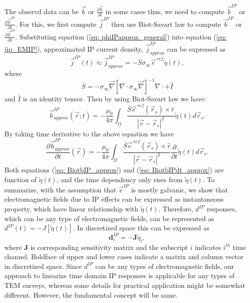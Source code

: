 \documentclass[a4paper, 11pt]{article}
\renewcommand{\div}{\nabla\cdot}
\newcommand{\grad}{\vec \nabla}
\newcommand{\siginf}{\sigma_\infty}
\renewcommand {\j}  { {\vec j} }
\renewcommand {\b}  { {\vec b} }
\newcommand {\e}  { {\vec e} }
\newcommand{\peta}{\tilde{\eta}}
\newcommand{\dip}{d^{IP}}
\begin{document}
The observd data can be $\b$ or $\frac{\partial \b}{\partial t}$ in some cases thus, we need to compute $\b^{IP}$ or $\frac{\partial \b^{IP}}{\partial t}$. For this, we first compute $\j^{IP}$ then use Biot-Savart law to compute $\b^{IP}$ or $\frac{\partial \b^{IP}}{\partial t}$. Substituting equation (\ref{eq: phiIPapprox_general}) into equation (\ref{eq: jip_EMIP}), approximated IP current density, $\j^{IP}_{approx}$ can be expressed as
\begin{equation}
  \j^{IP}(t) \approx \j^{IP}_{approx} = -\bar{S}\siginf\e^{\ ref}\peta(t),
  \label{eq: jip_approx}
\end{equation}
where
\begin{equation}
  \bar{S} = -\siginf\grad[\div \siginf\grad]^{-1}\div+\bar{I}
\end{equation}
and $\bar{I}$ is an identity tensor. Then by using Biot-Savart law we have:
\begin{equation}
  \b^{IP}_{approx}(\vec{r}; t) = -\frac{\mu_0}{4\pi}\int_{\Omega}  \frac{\bar{S}\e^{\ ref}(\vec{r}_s)\times\hat{r}}{|\vec{r}-\vec{r}_s|^2}\peta(t)d\vec{r}_s.
  \label{eq: BiotbIP_approx}
\end{equation}
By taking time derivative to the above equation we have
\begin{equation}
  \frac{\partial\b^{IP}_{approx}}{\partial t}(\vec{r}) = -\frac{\mu_0}{4\pi} \int_{\Omega}  \frac{\bar{S}\e^{\ ref}(\vec{r}_s)\times\hat{r}}{|\vec{r}-\vec{r}_s|^2}\frac{\partial}{\partial t}\peta(t)d\vec{r}_s.
  \label{eq: BiotbIPdt_approx}
\end{equation}
Both equations (\ref{eq: BiotbIP_approx}) and (\ref{eq: BiotbIPdt_approx}) are function of $\peta(t)$, and the time dependency only rises from $\peta(t)$. 
To summarize, with the assumption that $\e^{IP}$ is mostly galvanic, we show that electromagnetic fields due to IP effects can be expressed as instantaneous property, which have linear relationship with $\peta(t)$. Therefore, $\dip$ responses, which can be any type of electromagnetic fields, can be represented as $\dip(t) = -J[\peta(t)]$. In discretized space this can be expressed as
\begin{equation}
  \mathbf{d}^{IP}_i = -\mathbf{J}\peta_i,
  \label{eq: dIP_lineareq}
\end{equation}
where $\mathbf{J}$ is corresponding sensitivity matrix and the subscript $i$ indicates $i^{th}$ time channel. Boldface of upper and lower cases indicate a matrix and column vector in discretized space. Since $\dip$ can be any types of electromagnetic fields, our approach to linearize time domain IP responses is applicable for any types of TEM surveys, whereas some details for practical application might be somewhat different. However, the fundamental concept will be same.
\end{document}
